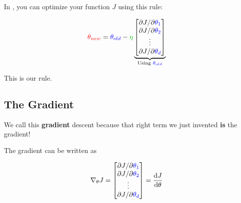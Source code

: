         \begin{kequation}
            In , you can optimize your function $J$ using this rule:
            
            \begin{equation*}
                \red{ \theta_{new} } =  \blu{ \theta_{old} } 
                - \grn{ \eta } 
                \underbrace{
                    \begin{bmatrix}
                          \pderivslash{J}{ \blu{\theta_1} } \\ 
                          \pderivslash{J}{ \blu{\theta_2} } \\
                          \vdots \\
                          \pderivslash{J}{ \blu{\theta_d} } \\
                    \end{bmatrix}
                }_{ \text{Using } \blu{ \theta_{old} } }
            \end{equation*}
            
            This is our  rule.
        \end{kequation}

    \subsection{The Gradient}
    
        We call this \textbf{gradient} descent because that right term we just invented \textbf{is} the gradient!\\
        
        \begin{definition}
            
            The gradient can be written as
            
            \begin{equation*}
                \nabla_\theta J 
                = 
                \begin{bmatrix}
                      {\partial J}/{\partial  \textcolor{blue}{\theta_1} } \\ 
                      {\partial J}/{\partial  \textcolor{blue}{\theta_2} } \\
                      \vdots \\
                      {\partial J}/{\partial  \textcolor{blue}{\theta_d} } \\
                \end{bmatrix}
                =
                \frac{\dd J}{\dd \theta}
            \end{equation*} 
        \end{definition}
        
